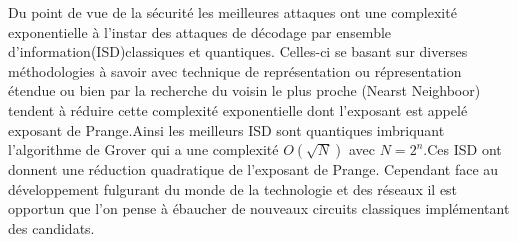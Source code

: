 \documentclass[12pt,openany]{report}
\begin{document}
Du point de vue de la sécurité les meilleures attaques ont une complexité exponentielle à l'instar des attaques de décodage par ensemble d'information(ISD)classiques et quantiques. Celles-ci se basant sur diverses méthodologies à savoir avec technique de représentation ou répresentation étendue ou bien par la recherche du voisin le plus proche (Nearst Neighboor) tendent à réduire cette complexité exponentielle dont l'exposant est appelé exposant de Prange.Ainsi les meilleurs ISD sont quantiques imbriquant l'algorithme de Grover qui a une complexité $\mathit{O}(\sqrt{N})  $ avec $N=2^n $.Ces ISD ont donnent une réduction quadratique de l'exposant de Prange.
Cependant face au développement fulgurant du monde de la technologie et des réseaux il est opportun que l'on pense à ébaucher de nouveaux circuits classiques implémentant des candidats.
\end{document}
